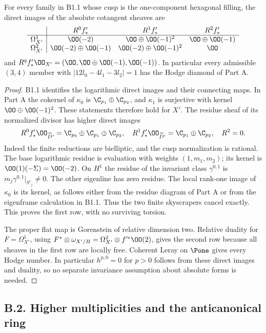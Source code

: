 \begin{proposition}\label{inv:B1.2}
For every family in B1.1 whose cusp is the one-component hexagonal filling,
the direct images of the absolute cotangent sheaves are
\[
\begin{array}{c|ccc}
 &R^0f'_*&R^1f'_*&R^2f'_*\\\hline
\Omega^1_{X'}&\OO(-2)&\OO\oplus\OO(-1)^2&\OO\oplus\OO(-1)\\
\Omega^2_{X'}&\OO(-2)\oplus\OO(-1)&\OO(-2)\oplus\OO(-1)^2&\OO
\end{array}
\]
and $R^qf'_*\OO_{X'}=(\OO,\OO\oplus\OO(-1),\OO(-1))$.
In particular every admissible $(3,4)$ member with
$|12l_0-4l_1-3l_2|=1$ has the Hodge diamond of Part A.
\end{proposition}
\begin{proof}
B1.1 identifies the logarithmic direct images and their connecting maps.
In Part A the cokernel of $\kappa_0$ is
$\C_{p_1}\oplus\C_{p_2}$, and $\kappa_1$ is surjective with kernel
$\OO\oplus\OO(-1)^2$. These statements therefore hold for $X'$.
The residue sheaf of its normalized divisor has higher direct images
\[
R^0f'_*\OO_{\widetilde D'}=\C_{p_0}\oplus\C_{p_1}\oplus\C_{p_2},
\quad R^1f'_*\OO_{\widetilde D'}=\C_{p_1}\oplus\C_{p_2},
\quad R^2=0.
\]
Indeed the finite reductions are bielliptic, and the cusp normalization
is rational. The base logarithmic residue is evaluation with weights
$(1,m_1,m_2)$; its kernel is $\OO(1)(-\Sigma)=\OO(-2)$.
On $H^1$ the residue of the invariant class $\gamma^{0,1}$ is
$m_j\gamma^{0,1}|_{S'_j}\ne0$. The other eigenline has zero residue.
The local rank-one image of $\kappa_0$ is its kernel, as follows either
from the residue diagram of Part A or from the eigenframe calculation
in B1.1. Thus the two finite skyscrapers cancel exactly. This proves
the first row, with no surviving torsion.

The proper flat map is Gorenstein of relative dimension two. Relative
duality for $F=\Omega^1_{X'}$, using
$F^*\otimes\omega_{X'/B}=\Omega^2_{X'}\otimes f'^*\OO(2)$,
gives the second row because all sheaves in the first row are locally
free. Coherent Leray on $\Pone$ gives every Hodge number. In particular
$h^{p,0}=0$ for $p>0$ follows from these direct images and duality,
so no separate invariance assumption about absolute forms is needed.
\end{proof}

\subsection{B.2. Higher multiplicities and the anticanonical ring}

